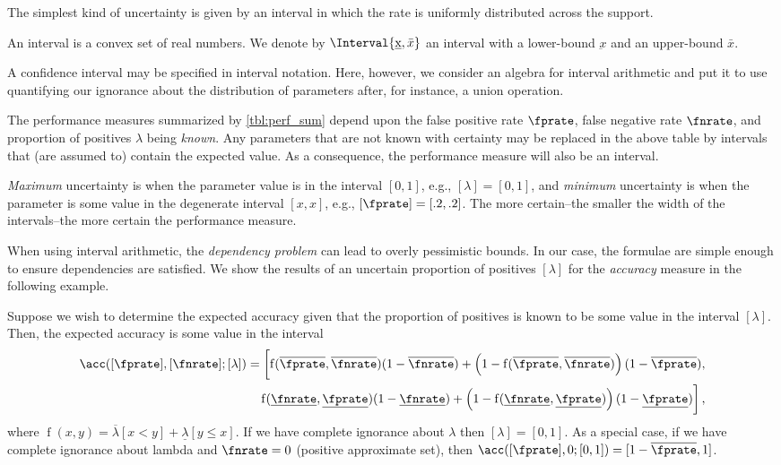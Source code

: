 \documentclass[ ../main.tex]{subfiles}
\begin{document}
The simplest kind of uncertainty is given by an interval in which the rate is uniformly distributed across the support.
\begin{definition}
An interval is a convex set of real numbers.
We denote by $\Interval{\underbar{x},\bar{x}}$ an interval with a lower-bound $\underbar{x}$ and an upper-bound $\bar{x}$.
\end{definition}

A confidence interval may be specified in interval notation.
Here, however, we consider an algebra for interval arithmetic and put it to use quantifying our ignorance about the distribution of parameters after, for instance, a union operation.

The performance measures summarized by \cref{tbl:perf_sum} depend upon the false positive rate $\fprate$, false negative rate $\fnrate$, and proportion of positives $\lambda$ being \emph{known}.
Any parameters that are not known with certainty may be replaced in the above table by intervals that (are assumed to) contain the expected value.
As a consequence, the performance measure will also be an interval.

\emph{Maximum} uncertainty is when the parameter value is in the interval $[0,1]$, e.g., $[\lambda] = [0,1]$, and \emph{minimum} uncertainty is when the parameter is some value in the degenerate interval $[x,x]$, e.g., $[\fprate] = [.2,.2]$. The more certain--the smaller the width of the intervals--the more certain the performance measure.

When using interval arithmetic, the \emph{dependency problem} can lead to overly pessimistic bounds.
In our case, the formulae are simple enough to ensure dependencies are satisfied. We show the results of an uncertain proportion of positives $[\lambda]$ for the \emph{accuracy} measure in the following example.

\begin{example}
	Suppose we wish to determine the expected accuracy given that the proportion of positives is known to be some value in the interval 
	$[\lambda]$. Then, the expected accuracy is some value in the interval
	\begin{equation}
		\begin{split}
		\acc([\fprate],[\fnrate] ; [\lambda]) =
		\biggl[
		\operatorname{f}(\overline{\fprate},\overline{\fnrate})(1-\overline{\fnrate}) + 
		\left(1-\operatorname{f}(\overline{\fprate},\overline{\fnrate})\right)(1-\overline{\fprate}),\\
		\operatorname{f}(\underline{\fnrate},\underline{\fprate})(1-\underline{\fnrate}) + 
		\left(1-\operatorname{f}(\underline{\fnrate},\underline{\fprate})\right)(1-\underline{\fprate})
		\biggr]\,,
		\end{split}
		\end{equation}
		where $\operatorname{f}(x,y) = \overline{\lambda}[x < y] + 
		\underline{\lambda}[y \leq x]$. If we have complete ignorance about 
		$\lambda$ then $[\lambda] = [0,1]$. As a special case, if we have 
		complete 
		ignorance about lambda and $\fnrate = 0$ (positive approximate set), 
		then 
		$\acc([\fprate],0 ; [0,1]) = [1-\overline{\fprate}, 1]$.
\end{example}
\end{document}
